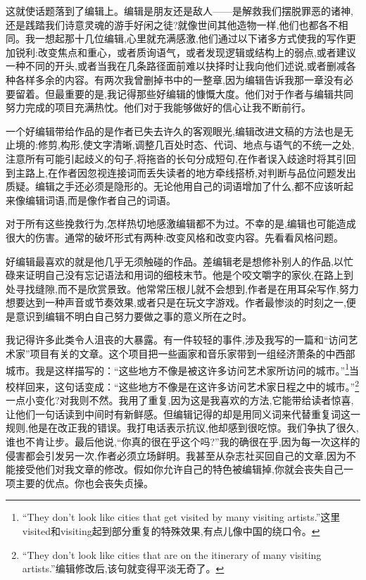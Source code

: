 这就使话题落到了编辑上。编辑是朋友还是敌人——是解救我们摆脱罪恶的诸神,还是践踏我们诗意灵魂的游手好闲之徒?就像世间其他造物一样,他们也都各不相同。我一想起那十几位编辑,心里就充满感激,他们通过以下诸多方式使我的写作更加锐利:改变焦点和重心，或者质询语气，或者发现逻辑或结构上的弱点,或者建议一种不同的开头,或者当我在几条路径面前难以抉择时让我向他们述说,或者删减各种各样多余的内容。有两次我曾删掉书中的一整章,因为编辑告诉我那一章没有必要留着。但最重要的是,我记得那些好编辑的慷慨大度。他们对于作者与编辑共同努力完成的项目充满热忱。他们对于我能够做好的信心让我不断前行。

一个好编辑带给作品的是作者已失去许久的客观眼光,编辑改进文稿的方法也是无止境的:修剪,构形,使文字清晰,调整几百处时态、代词、地点与语气的不统一之处,注意所有可能引起歧义的句子,将拖沓的长句分成短句,在作者误入歧途时将其引回到主路上,在作者因忽视连接词而丢失读者的地方牵线搭桥,对判断与品位问题发出质疑。编辑之手还必须是隐形的。无论他用自己的词语增加了什么,都不应该听起来像编辑词语,而是像作者自己的词语。

对于所有这些挽救行为,怎样热切地感激编辑都不为过。不幸的是,编辑也可能造成很大的伤害。通常的破坏形式有两种:改变风格和改变内容。先看看风格问题。

好编辑最喜欢的就是他几乎无须触碰的作品。差编辑老是想修补别人的作品,以忙碌来证明自己没有忘记语法和用词的细枝末节。他是个咬文嚼字的家伙,在路上到处寻找缝隙,而不是欣赏景致。他常常压根儿就不会想到,作者是在用耳朵写作,努力想要达到一种声音或节奏效果,或者只是在玩文字游戏。作者最惨淡的时刻之一,便是意识到编辑不明白自己努力要做之事的意义所在之时。

我记得许多此类令人沮丧的大暴露。有一件较轻的事件,涉及我写的一篇和“访问艺术家”项目有关的文章。这个项目把一些画家和音乐家带到一组经济萧条的中西部城市。我是这样描写的：“这些地方不像是被这许多访问艺术家所访问的城市。”\footnote{“They don’t look like cities that get visited by many visiting artists.”这里visited和visiting起到部分重复的特殊效果,有点儿像中国的绕口令。}当校样回来，这句话变成：“这些地方不像是在这许多访问艺术家日程之中的城市。”\footnote{“They don’t look like cities that are on the itinerary of many visiting artists.”编辑修改后,该句就变得平淡无奇了。}一点小变化?对我则不然。我用了重复,因为这是我喜欢的方法,它能带给读者惊喜,让他们一句话读到中间时有新鲜感。但编辑记得的却是用同义词来代替重复词这一规则,他是在改正我的错误。我打电话表示抗议,他却感到很吃惊。我们争执了很久,谁也不肯让步。最后他说,“你真的很在乎这个吗?”我的确很在乎,因为每一次这样的侵害都会引发另一次,作者必须立场鲜明。我甚至从杂志社买回自己的文章,因为不能接受他们对我文章的修改。假如你允许自己的特色被编辑掉,你就会丧失自己一项主要的优点。你也会丧失贞操。

